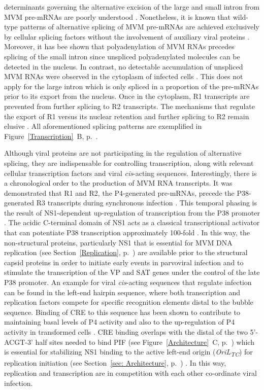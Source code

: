 determinants governing the alternative excision of the large and small intron from MVM pre-mRNAs are poorly understood \cite{pmid9499034, pmid10329570, pmid8151756, pmid7666519, pmid7637034, pmid9858560}. Nonetheless, it is known that wild-type patterns of alternative splicing of MVM pre-mRNAs are achieved exclusively by cellular splicing factors without the involvement of auxiliary viral proteins \cite{pmid1592259}. Moreover, it has bee shown that polyadenylation of MVM RNAs precedes splicing of the small intron since unspliced polyadenylated molecules can be detected in the nucleus. In contrast, no detectable accumulation of unspliced MVM RNAs were observed in the cytoplasm of infected cells \cite{pmid3346950}. This does not apply for the large intron which is only spliced in a proportion of the pre-mRNAs prior to its export from the nucleus. Once in the cytoplasm, R1 transcripts are prevented from further splicing to R2 transcripts. The mechanisms that regulate the export of R1 versus its nuclear retention and further splicing to R2 remain elusive \cite{Transcription}. All aforementioned splicing patterns are exemplified in Figure~\ref{Transcription}~B, p.~\pageref{Transcription}. 

Although viral proteins are not participating in the regulation of alternative splicing, they are indispensable for controlling transcription, along with relevant cellular transcription factors and viral \textit{cis}-acting sequences. Interestingly, there is a chronological order to the production of MVM RNA transcripts. It was demonstrated that R1 and R2, the P4-generated pre-mRNAs, precede the P38-generated R3 transcripts during synchronous infection \cite{pmid3346950}. This temporal phasing is the result of NS1-dependent up-regulation of transcription from the P38 promoter \cite{pmid3171551, pmid4020972}. The acidic C-terminal domain of NS1 acts as a classical transcriptional activator that can potentiate P38 transcription approximately 100-fold \cite{pmid1388209}. In this way, the non-structural proteins, particularly NS1 that is essential for MVM DNA replication (see Section~\ref{Replication}, p.~\pageref{Replication}) are available prior to the structural capsid proteins in order to initiate early events in parvoviral infection and to stimulate the transcription of the VP and SAT genes under the control of the late P38 promoter. An example for viral \textit{cis}-acting sequences that regulate infection can be found in the left-end hairpin sequence, where both transcription and replication factors compete for specific recognition elements distal to the bubble sequence. Binding of CRE to this sequence has been shown to contribute to maintaining basal levels of P4 activity and also to the up-regulation of P4 activity in transformed cells \cite{pmid7636996, pmid8627649}. CRE binding overlaps with the distal of the two 5'-ACGT-3' half sites needed to bind PIF (see Figure~\ref{Architecture}~C, p.~\pageref{Architecture}) which is essential for stabilizing NS1 binding to the active left-end origin (\textit{OriL\textsubscript{TC}}) for replication initiation (see Section~\ref{sec: Architecture}, p.~\pageref{sec: Architecture}) \cite{pmid12050365}. In this way, replication and transcription are in competition with each other co-ordinate viral infection.            

